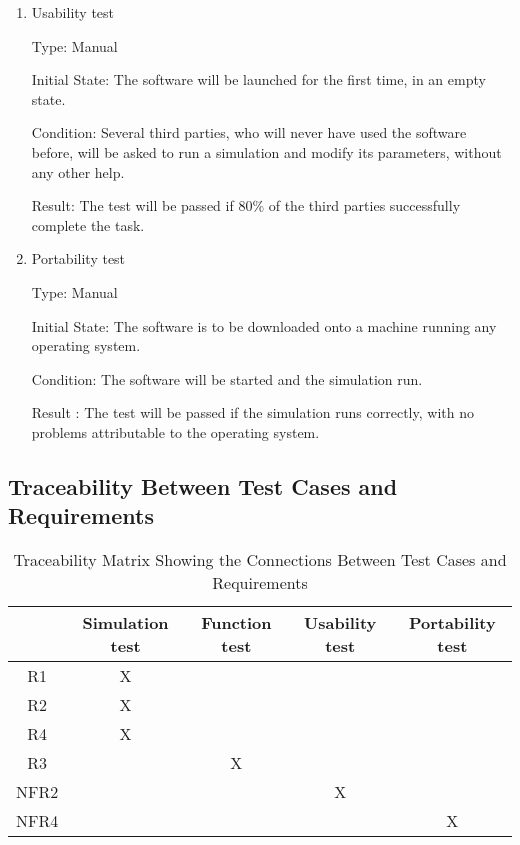 \documentclass[12pt, titlepage]{article}
\begin{document}
\begin{enumerate}

\item{Usability test\\}

Type: Manual
					
Initial State: The software will be launched for the first time, in an empty state.
					
Condition: Several third parties, who will never have used the software before, will be asked to run a simulation and modify its parameters, without any other help.
					
Result: The test will be passed if 80\% of the third parties successfully complete the task.
					
\item{Portability test\\}

Type: Manual
					
Initial State: The software is to be downloaded onto a machine running any operating system.
					
Condition: The software will be started and the simulation run.
					
Result : The test will be passed if the simulation runs correctly, with no problems attributable to the operating system. 
					

\end{enumerate}


\subsection{Traceability Between Test Cases and Requirements}

\begin{table}[h!]
  \centering
  \begin{tabular}{|c|c|c|c|c|}
  \hline        
    & Simulation test & Function test & Usability test &  Portability test\\
  \hline
  R1   & X &   &   & \\ \hline
  R2   & X &   &   &\\ \hline
  R4   & X &   &   & \\ \hline
  R3   &   & X &   & \\ \hline
  NFR2 &   &   & X & \\ \hline
  NFR4 &   &   &   & X\\

  \hline
  \end{tabular}
  \caption{Traceability Matrix Showing the Connections Between Test Cases and Requirements}
  \label{Table:trace}
  \end{table}
\end{document}
